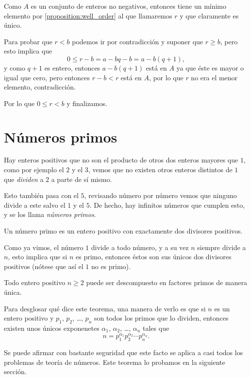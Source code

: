 Como $A$ es un conjunto de enteros no
negativos, entonces tiene un mínimo
elemento por \autoref{proposition:well_order}
al que llamaremos $r$ y que claramente es
único.

Para probar que $r < b$ podemos ir por
contradicción y suponer que $r \geq b$,
pero esto implica que
\[0 \leq r - b = a - bq - b = a - b(q + 1),\]
y como $q + 1$ es entero, entonces
$a - b(q + 1)$ está en $A$ ya que éste
es mayor o igual que cero,
pero entonces $r - b < r$
está en $A$, por lo que $r$
no era el menor elemento, contradicción.

Por lo que $0 \leq r < b$ y finalizamos.

\section{Números primos}
Hay enteros positivos que no son el
producto de otros dos enteros mayores que $1$,
como por ejemplo el $2$ y el $3$,
vemos que no existen otros enteros
distintos de $1$ que \textit{dividen}
a $2$ a parte de sí mismo.

Esto también pasa con el $5$, revisando número
por número vemos que ninguno divide a este
salvo el $1$ y el $5$. De hecho, hay infinitos
números que cumplen esto, y se los
llama \textit{números primos}.

\begin{definition}
	Un número primo es un entero positivo con
	exactamente dos divisores positivos.
\end{definition}

Como ya vimos, el número $1$ divide a todo número,
y a su vez $n$ siempre divide a $n$, esto implica
que si $n$ es primo, entonces éstos son sus únicos
dos divisores positivos (nótese que así el $1$ no es primo).

\begin{theorem}
	Todo entero positivo $n \geq 2$ puede ser descompuesto
	en factores primos de manera única.
\end{theorem}

Para desglosar qué dice este teorema,
una manera de verlo es que si $n$ es un
entero positivo y $p_1$, $p_2$, \dots, $p_n$
son todos los primos que lo dividen, entonces
existen unos únicos exponenetes $\alpha_1$, $\alpha_2$,
\dots, $\alpha_n$ tales que
\[n = p_1^{\alpha_1}p_2^{\alpha_2}\cdots p_n^{\alpha_n}.\]

Se puede afirmar con bastante seguridad que
este facto se aplica a casi todos los problemas
de teoría de números.
Este teorema lo probamos en la siguiente sección.

